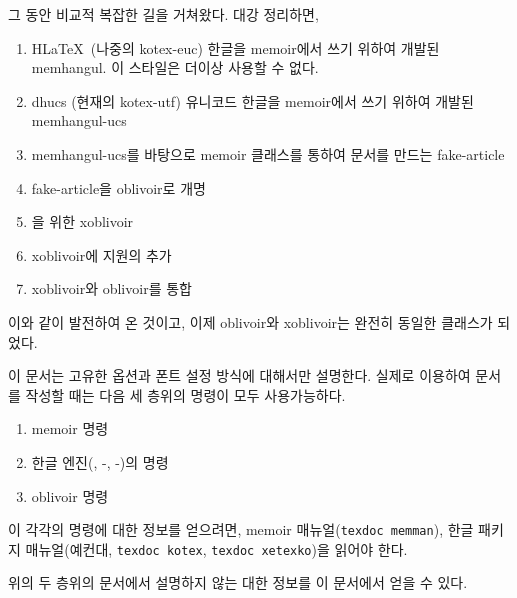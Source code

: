 \documentclass[
	12pt,
	a4paper,
	kosection,
	footnote,
	nobookmarks,
	microtype,
	figtabcapt,
]{oblivoir}
\newcommand\obclass{ob\-liv\-oir\oblivoirallowbreak}
\begin{document}
그 동안  비교적 복잡한 길을 거쳐왔다. 대강 정리하면,
\begin{enumerate}[(1)]\tightlist
\item H\LaTeX\ (나중의 kotex-euc) 한글을 memoir에서 쓰기 위하여 개발된 memhangul. 이 스타일은 더이상 사용할 수 없다.
\item dhucs (현재의 kotex-utf) 유니코드 한글을 memoir에서 쓰기 위하여 개발된 memhangul-ucs
\item memhangul-ucs를 바탕으로 memoir 클래스를 통하여 문서를 만드는 fake-article
\item fake-article을 oblivoir로 개명
\item {}을 위한 xoblivoir
\item xoblivoir에  지원의 추가
\item xoblivoir와 oblivoir를 통합
\end{enumerate}
이와 같이 발전하여 온 것이고, 이제 oblivoir와 xoblivoir는 완전히 동일한 클래스가 되었다.

이 문서는  고유한 옵션과 폰트 설정 방식에 대해서만 설명한다. 실제로 
이용하여 문서를 작성할 때는 다음 세 층위의 명령이 모두 사용가능하다.
\begin{enumerate}[(1)]\tightlist
\item memoir 명령
\item 한글 엔진(\koTeX, \XeTeX-\ko, \LuaTeX-\ko)의 명령
\item oblivoir 명령
\end{enumerate}

이 각각의 명령에 대한 정보를 얻으려면, memoir 매뉴얼(\texttt{texdoc memman}), 
한글 패키지 매뉴얼(예컨대, \texttt{texdoc kotex}, \texttt{texdoc xetexko})을
읽어야 한다.

위의 두 층위의 문서에서 설명하지 않는  대한 정보를 이 문서에서 얻을 수 있다.
\end{document}
